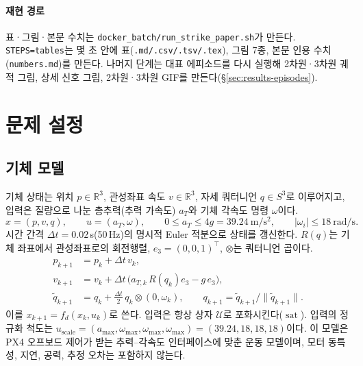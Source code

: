 \documentclass[10pt,a4paper]{article}
\newcommand{\R}{\mathbb{R}}
\newcommand{\sat}{\operatorname{sat}}
\newcommand{\file}[1]{\texttt{\small #1}}
\begin{document}
\paragraph{재현 경로} 표·그림·본문 수치는 \file{docker\_batch/run\_strike\_paper.sh}가 만든다.
\file{STEPS=tables}는 몇 초 안에 표(\file{.md/.csv/.tsv/.tex}), 그림 7종, 본문 인용 수치(\file{numbers.md})를 만든다.
나머지 단계는 대표 에피소드를 다시 실행해 2차원·3차원 궤적 그림, 상세 신호 그림, 2차원·3차원 GIF를 만든다(\S\ref{sec:results-episodes}).

\section{문제 설정}\label{sec:problem}

\subsection{기체 모델}
기체 상태는 위치 $p\in\R^3$, 관성좌표 속도 $v\in\R^3$, 자세 쿼터니언 $q\in S^3$로 이루어지고,
입력은 질량으로 나눈 총추력(추력 가속도) $a_T$와 기체 각속도 명령 $\omega$이다.
\begin{equation}
x=(p,v,q),\qquad u=(a_T,\omega),\qquad 0\le a_T\le 4g=39.24\ \mathrm{m/s^2},\qquad |\omega_i|\le 18\ \mathrm{rad/s}.
\label{eq:state}
\end{equation}
시간 간격 $\Delta t=0.02$\,s(50\,Hz)의 명시적 Euler 적분으로 상태를 갱신한다. $R(q)$는 기체 좌표에서 관성좌표로의 회전행렬, $e_3=(0,0,1)^\top$, $\otimes$는 쿼터니언 곱이다.
\begin{align}
p_{k+1}&=p_k+\Delta t\,v_k, \label{eq:dyn-p}\\
v_{k+1}&=v_k+\Delta t\,\big(a_{T,k}\,R(q_k)e_3-g\,e_3\big), \label{eq:dyn-v}\\
\tilde q_{k+1}&=q_k+\tfrac{\Delta t}{2}\,q_k\otimes(0,\omega_k),\qquad q_{k+1}=\tilde q_{k+1}/\|\tilde q_{k+1}\|. \label{eq:dyn-q}
\end{align}
이를 $x_{k+1}=f_d(x_k,u_k)$로 쓴다. 입력은 항상 상자 $\mathcal U$로 포화시킨다($\sat$).
입력의 정규화 척도는 $u_{\mathrm{scale}}=(a_{\max},\omega_{\max},\omega_{\max},\omega_{\max})=(39.24,18,18,18)$이다.
이 모델은 PX4 오프보드 제어가 받는 추력--각속도 인터페이스에 맞춘 운동 모델이며, 모터 동특성, 지연, 공력, 추정 오차는 포함하지 않는다.
\end{document}
